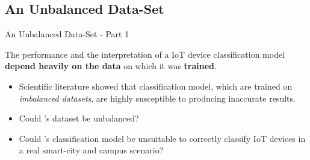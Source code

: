 \documentclass[10pt]{beamer}
\begin{document}
\subsection{An Unbalanced Data-Set}
\begin{frame}{An Unbalanced Data-Set - Part 1}

\begin{block}{}
\justifying
The performance and the interpretation of a IoT device classification model \textbf{depend heavily on the data} on which it was \textbf{trained}. 

\begin{itemize}
\justifying
\item Scientific literature showed that classification model, which are trained on \textit{imbalanced datasets}, are highly susceptible to producing inaccurate results. 
\end{itemize}
\end{block}

\begin{alertblock}{}
\begin{itemize}
\justifying
\item Could \citet{ITPAReport}'s dataset be unbalanced? 

\item Could \citet{ITPAReport}'s classification model be unsuitable to correctly classify IoT devices in a real smart-city and campus scenario?
\end{itemize}
\end{alertblock}

\end{frame} 
\end{document}
